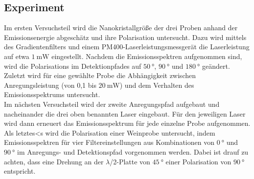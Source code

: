 \subsection{Experiment}
\label{sec:Experiment}
Im ersten Versuchsteil wird die Nanokristallgröße der drei Proben anhand der Emissionsenergie
abgeschätz und ihre Polarisation untersucht. Dazu wird mittels des Gradientenfilters
und einem PM400-Laserleistungsmessgerät die Laserleistung auf etwa $\SI{1}{\milli\watt}$
eingestellt. Nachdem die Emissionsspektren aufgenommen sind, wird die Polarisations
im Detektionpfades auf $\SI{50}{\degree}$, $\SI{90}{\degree}$ und $\SI{180}{\degree}$
geändert.
Zuletzt wird für eine gewählte Probe die Abhängigkeit zwischen Anregungsleistung
(von 0,1 bis $\SI{20}{\milli\watt}$) und dem Verhalten des Emissionsspektrums
untersucht.\\
Im nächsten Versuchsteil wird der zweite Anregungspfad aufgebaut und
nacheinander die drei oben benannten Laser eingebaut. Für den jeweiligen Laser
wird dann erneuert das Emissionsspektrum für jede einzelne Probe aufgenommen.\\
Als letztes<s wird die Polarisation einer Weinprobe untersucht, indem Emissionsspektren
für vier Filtereinstellungen aus Kombinationen von $\SI{0}{\degree}$ und $\SI{90}{\degree}$
im Anregungs- und Detektionspfad vorgenommen werden. Dabei ist drauf zu achten,
dass eine Drehung an der  $\lambda$/2-Platte von $\SI{45}{\degree}$ einer Polarisation
von $\SI{90}{\degree}$ entspricht.
